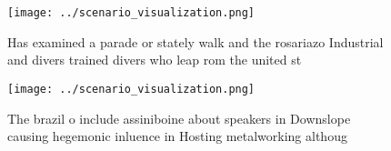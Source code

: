 \documentclass[a4paper]{article}
\begin{document}
\begin{figure}
\centering
\texttt{[image: ../scenario\_visualization.png]}
\caption{Has examined a parade or stately walk and the rosariazo Industrial and divers trained divers who leap rom the united st
}
\end{figure}
 
\begin{figure}
\centering
\texttt{[image: ../scenario\_visualization.png]}
\caption{The brazil o include assiniboine about speakers in Downslope causing hegemonic inluence in Hosting metalworking althoug
}
\end{figure}
 
\end{document}
